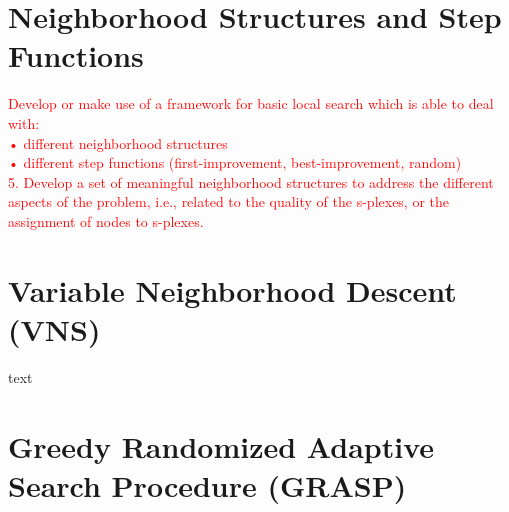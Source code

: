 \section{Neighborhood Structures and Step Functions}

\textcolor{red}{
Develop or make use of a framework for basic local search which is able to deal with: \\
• different neighborhood structures\\
• different step functions (first-improvement, best-improvement, random)\\
5. Develop a set of meaningful neighborhood structures to address the different aspects of the problem,
i.e., related to the quality of the s-plexes, or the assignment of nodes to s-plexes.}

\pagebreak

\section{Variable Neighborhood Descent (VNS)}
text

\pagebreak

\section{Greedy Randomized Adaptive Search Procedure (GRASP)}